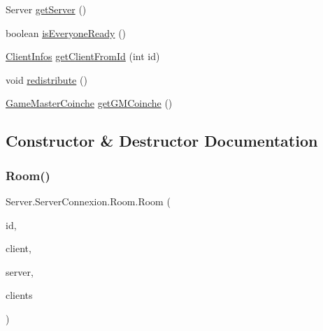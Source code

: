 \begin{DoxyCompactItemize}
\item 
Server \mbox{\hyperlink{classServer_1_1ServerConnexion_1_1Room_a82aa25bc3f5406ce06589c92f12f59e1}{get\+Server}} ()
\item 
boolean \mbox{\hyperlink{classServer_1_1ServerConnexion_1_1Room_a2e67e0da5adef24542d2082828e75a88}{is\+Everyone\+Ready}} ()
\item 
\mbox{\hyperlink{classServer_1_1ServerConnexion_1_1ClientInfos}{Client\+Infos}} \mbox{\hyperlink{classServer_1_1ServerConnexion_1_1Room_a60fc7bece76f7b765c2d32501af4d960}{get\+Client\+From\+Id}} (int id)
\item 
void \mbox{\hyperlink{classServer_1_1ServerConnexion_1_1Room_a6a2dd1ea8ed605869b42d4b2a183acc4}{redistribute}} ()
\item 
\mbox{\hyperlink{classServer_1_1Game_1_1GameMasterCoinche}{Game\+Master\+Coinche}} \mbox{\hyperlink{classServer_1_1ServerConnexion_1_1Room_aa7f336575bfad4b96f80c164f41d1517}{get\+G\+M\+Coinche}} ()
\end{DoxyCompactItemize}


\subsection{Constructor \& Destructor Documentation}
\mbox{\label{classServer_1_1ServerConnexion_1_1Room_a191c2d5940dc3c6cb1fece18e879a64d}} 
\subsubsection{\texorpdfstring{Room()}{Room()}}
{\footnotesize\ttfamily Server.\+Server\+Connexion.\+Room.\+Room (\begin{DoxyParamCaption}\item[{int}]{id,  }\item[{\mbox{\hyperlink{classServer_1_1ServerConnexion_1_1ClientInfos}{Client\+Infos}}}]{client,  }\item[{Server}]{server,  }\item[{Concurrent\+Hash\+Map$<$ Integer, \mbox{\hyperlink{classServer_1_1ServerConnexion_1_1ClientInfos}{Client\+Infos}} $>$}]{clients }\end{DoxyParamCaption})\hspace{0.3cm}{\ttfamily [inline]}}



